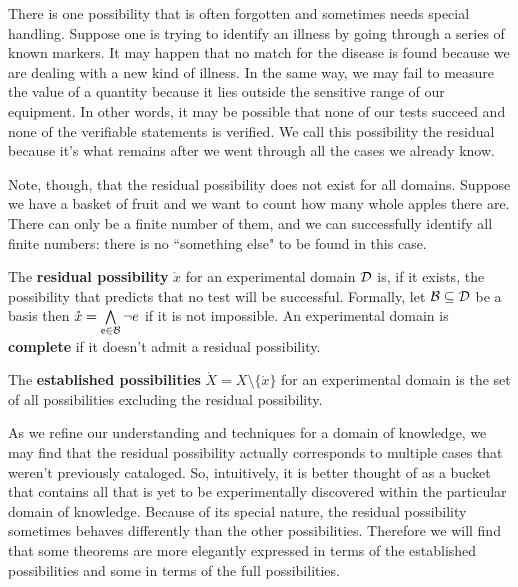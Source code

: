	There is one possibility that is often forgotten and sometimes needs special handling. Suppose one is trying to identify an illness by going through a series of known markers. It may happen that no match for the disease is found because we are dealing with a new kind of illness. In the same way, we may fail to measure the value of a quantity because it lies outside the sensitive range of our equipment. In other words, it may be possible that none of our tests succeed and none of the verifiable statements is verified. We call this possibility the residual because it's what remains after we went through all the cases we already know.
	
	Note, though, that the residual possibility does not exist for all domains. Suppose we have a basket of fruit and we want to count how many whole apples there are. There can only be a finite number of them, and we can successfully identify all finite numbers: there is no ``something else" to be found in this case.
	
	\begin{mathSection}
		\begin{defn}
			The \textbf{residual possibility} $\mathring{x}$ for an experimental domain $\edomain$ is, if it exists, the possibility that predicts that no test will be successful. Formally, let $\basis \subseteq \edomain$ be a basis then  $\mathring{x} = \bigAND\limits_{\stmt[e] \in \basis} \NOT e$ if it is not impossible. An experimental domain is \textbf{complete} if it doesn't admit a residual possibility.
		\end{defn}
		
		\begin{defn}
			The \textbf{established possibilities} $\dot{X}=X\setminus\{\mathring{x}\}$ for an experimental domain is the set of all possibilities excluding the residual possibility.
		\end{defn}
	\end{mathSection}
	
	As we refine our understanding and techniques for a domain of knowledge, we may find that the residual possibility actually corresponds to multiple cases that weren't previously cataloged. So, intuitively, it is better thought of as a bucket that contains all that is yet to be experimentally discovered within the particular domain of knowledge. Because of its special nature, the residual possibility sometimes behaves differently than the other possibilities. Therefore we will find that some theorems are more elegantly expressed in terms of the established possibilities and some in terms of the full possibilities.
	

